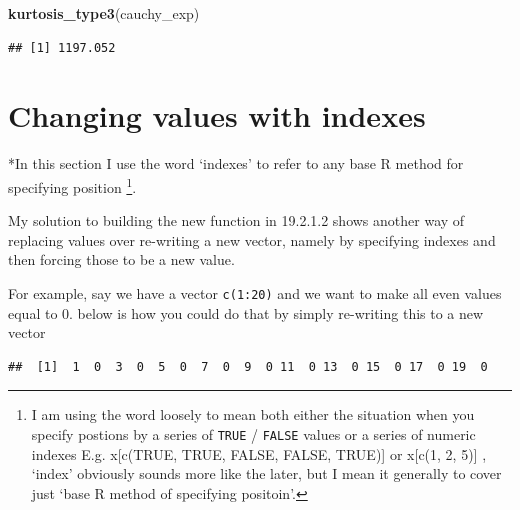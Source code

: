 \documentclass[]{book}
\newenvironment{Shaded}{\begin{snugshade}}{\end{snugshade}}
\newcommand{\DecValTok}[1]{\textcolor[rgb]{0.00,0.00,0.81}{#1}}
\newcommand{\KeywordTok}[1]{\textcolor[rgb]{0.13,0.29,0.53}{\textbf{#1}}}
\newcommand{\NormalTok}[1]{#1}
\newcommand{\OperatorTok}[1]{\textcolor[rgb]{0.81,0.36,0.00}{\textbf{#1}}}
\newcommand{\StringTok}[1]{\textcolor[rgb]{0.31,0.60,0.02}{#1}}
\let\rmarkdownfootnote\footnote%
\def\footnote{\protect\rmarkdownfootnote}
\theoremstyle{definition}
\theoremstyle{definition}
\theoremstyle{definition}
\theoremstyle{remark}
\begin{document}
\begin{Shaded}
\begin{Highlighting}[]
\KeywordTok{kurtosis_type3}\NormalTok{(cauchy_exp)}
\end{Highlighting}
\end{Shaded}

\begin{verbatim}
## [1] 1197.052
\end{verbatim}

\hypertarget{changing-values-with-indexes}{%
\section{Changing values with
indexes}\label{changing-values-with-indexes}}

*In this section I use the word `indexes' to refer to any base R method
for specifying position \footnote{I am using the word loosely to mean
  both either the situation when you specify postions by a series of
  \texttt{TRUE} / \texttt{FALSE} values or a series of numeric indexes
  E.g. x{[}c(TRUE, TRUE, FALSE, FALSE, TRUE){]} or x{[}c(1, 2, 5){]} ,
  `index' obviously sounds more like the later, but I mean it generally
  to cover just `base R method of specifying positoin'.}.

My solution to building the new function in 19.2.1.2 shows another way
of replacing values over re-writing a new vector, namely by specifying
indexes and then forcing those to be a new value.

For example, say we have a vector \texttt{c(1:20)} and we want to make
all even values equal to 0. below is how you could do that by simply
re-writing this to a new vector

\begin{Shaded}
\end{Shaded}

\begin{verbatim}
##  [1]  1  0  3  0  5  0  7  0  9  0 11  0 13  0 15  0 17  0 19  0
\end{verbatim}
\end{document}
